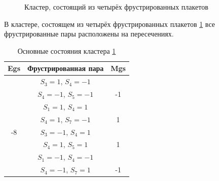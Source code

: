 \documentclass[utf8, babel, sor, jor, amsmath, amssymb, reprint]{elsarticle} %
\begin{document}
\begin{figure}[H]
	\centering
	\caption{Кластер, состоящий из четырёх фрустрированных плакетов}
	\label{fig:3x3}
\end{figure}

В кластере, состоящем из четырёх фрустрированных плакетов \ref{fig:3x3} все фрустрированные пары расположены на пересечениях.

\begin{table}[H]
	\centering
	\begin{tabular}{|c|c|c|}
		\hline
		Egs   &   Фрустрированная пара & Mgs\\
		\hline
		   &  $S_3=1$, $S_4=-1$&\\
		&    $S_4=-1$, $S_5=-1$ & -1\\
	\cline{2-3}
		   &  $S_1=1$, $S_4=1$&\\
		&    $S_4=1$, $S_7=-1$ & 1\\
			\cline{2-3}
		-8	\multirow{3}{*}{}
		  &  $S_3=-1$, $S_4=1$&\\
			&    $S_4=1$, $S_5=1$& 1\\
		\cline{2-3}
		   &  $S_1=-1$, $S_4=-1$&\\
			&    $S_4=-1$, $S_7=1$& -1\\
		\hline
	\end{tabular}
	\caption{Основные состояния кластера \ref{fig:3x3}}
	\label{tab:gs_3x3}
\end{table} 
\end{document}
